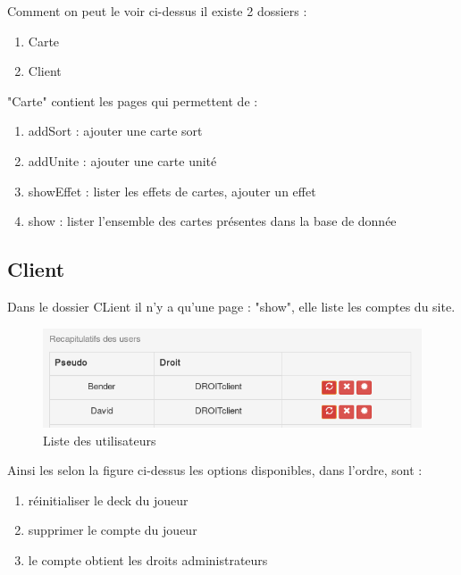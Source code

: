 \documentclass[a4paper,11pt]{report}
\begin{document}
	Comment on peut le voir ci-dessus il existe 2 dossiers :
	\begin{enumerate}
		\item Carte
		\item Client
	\end{enumerate}

	"Carte" contient les pages qui permettent de :
	\begin{enumerate}
		\item addSort : ajouter une carte sort
		\item addUnite : ajouter une carte unité
		\item showEffet : lister les effets de cartes, ajouter un effet
		\item show : lister l'ensemble des cartes présentes dans la base de donnée
	\end{enumerate}

        \subsection{Client}
         Dans le dossier CLient il n'y a qu'une page : "show", elle liste les comptes du site. 
        \begin{figure}[th]
      		\begin{center}
        	\includegraphics[scale=0.4]{Assets/liste_user.png}
        	\caption{Liste des utilisateurs}
        	\label{fig5}
      		\end{center}
    	\end{figure}

	Ainsi les selon la figure ci-dessus les options disponibles, dans l'ordre, sont : 
	\begin{enumerate}
		\item réinitialiser le deck du joueur
		\item supprimer le compte du joueur
		\item le compte obtient les droits administrateurs
	\end{enumerate}
         
\end{document}
